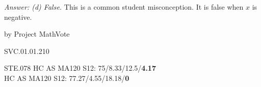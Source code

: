 {\it Answer:  (d) False.}  This is a common student misconception.  It is false when $x$ is negative.

\medskip
by Project MathVote

SVC.01.01.210

STE.078
HC AS MA120 S12: 75/8.33/12.5/{\bf4.17}  \\
HC AS MA120 S12: 77.27/4.55/18.18/{\bf0}  \\

